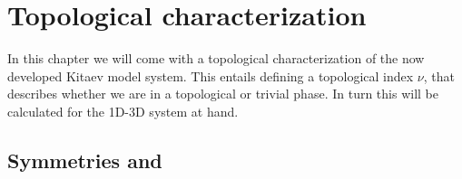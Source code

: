 
\chapter{Topological characterization} %

\label{Chapter7} %


In this chapter we will come with a topological characterization of the now developed Kitaev model system. This entails defining a topological index $\nu$, that describes whether we are in a topological or trivial phase. In turn this will be calculated for the 1D-3D system at hand. 

\section{Symmetries and}